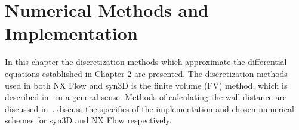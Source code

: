 \chapter{Numerical Methods and Implementation}
\label{chap:num}
In this chapter the discretization methods which approximate the differential equations established in Chapter 2 are presented.
The discretization methods used in both NX Flow and syn3D is the finite volume (FV) method, which is described in~ in a general sense. Methods of calculating the wall distance are discussed in~.  discuss the specifics of the implementation and chosen numerical schemes for syn3D and NX Flow respectively.
%
%




